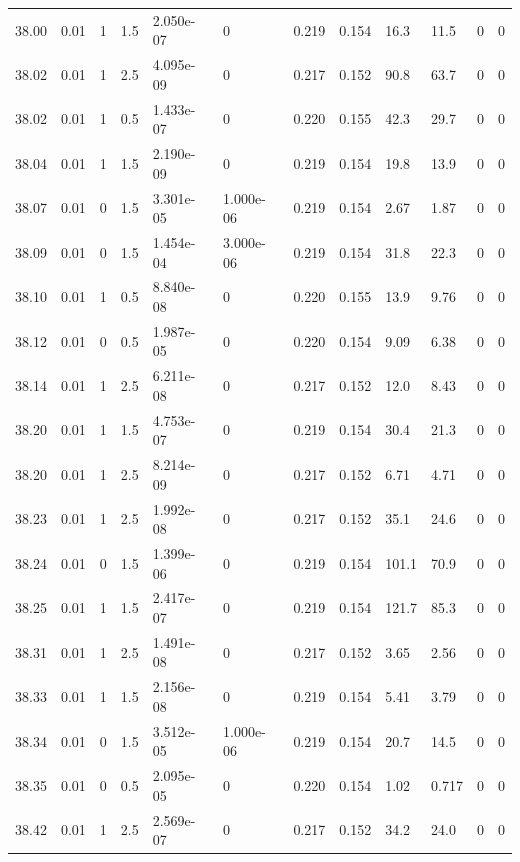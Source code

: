 \documentclass[preview]{standalone}
\begin{document}
{{{{{{{{{{{{{{{{{{\begin{tabular}{L{1.2cm}C{1.2cm} C{0.3cm}C{0.5cm} C{1.4cm}C{1.4cm} C{1.4cm}C{1.4cm} C{1.6cm}C{1.6cm} C{1.6cm}C{1.6cm}}
  38.00  &  0.01  & 1     & 1.5 &  2.050e-07  & 0  &  0.219&   0.154& 16.3 & 11.5   &  0 & 0  \\ 
  38.02  &  0.01  & 1     & 2.5 &  4.095e-09  & 0  &  0.217&   0.152& 90.8 & 63.7   &  0 & 0  \\ 
  38.02  &  0.01  & 1     & 0.5 &  1.433e-07  & 0  &  0.220&   0.155& 42.3 & 29.7   &  0 & 0  \\ 
  38.04  &  0.01  & 1     & 1.5 &  2.190e-09  & 0  &  0.219&   0.154& 19.8 & 13.9   &  0 & 0  \\ 
  38.07  &  0.01  & 0     & 1.5 &  3.301e-05  & 1.000e-06  &  0.219&   0.154& 2.67 & 1.87   &  0 & 0  \\ 
  38.09  &  0.01  & 0     & 1.5 &  1.454e-04  & 3.000e-06  &  0.219&   0.154& 31.8 & 22.3   &  0 & 0  \\ 
  38.10  &  0.01  & 1     & 0.5 &  8.840e-08  & 0  &  0.220&   0.155& 13.9 & 9.76   &  0 & 0  \\ 
  38.12  &  0.01  & 0     & 0.5 &  1.987e-05  & 0  &  0.220&   0.154& 9.09 & 6.38   &  0 & 0  \\ 
  38.14  &  0.01  & 1     & 2.5 &  6.211e-08  & 0  &  0.217&   0.152& 12.0 & 8.43   &  0 & 0  \\ 
  38.20  &  0.01  & 1     & 1.5 &  4.753e-07  & 0  &  0.219&   0.154& 30.4 & 21.3   &  0 & 0  \\ 
  38.20  &  0.01  & 1     & 2.5 &  8.214e-09  & 0  &  0.217&   0.152& 6.71 & 4.71   &  0 & 0  \\ 
  38.23  &  0.01  & 1     & 2.5 &  1.992e-08  & 0  &  0.217&   0.152& 35.1 & 24.6   &  0 & 0  \\ 
  38.24  &  0.01  & 0     & 1.5 &  1.399e-06  & 0  &  0.219&   0.154& 101.1 & 70.9   &  0 & 0  \\ 
  38.25  &  0.01  & 1     & 1.5 &  2.417e-07  & 0  &  0.219&   0.154& 121.7 & 85.3   &  0 & 0  \\ 
  38.31  &  0.01  & 1     & 2.5 &  1.491e-08  & 0  &  0.217&   0.152& 3.65 & 2.56   &  0 & 0  \\ 
  38.33  &  0.01  & 1     & 1.5 &  2.156e-08  & 0  &  0.219&   0.154& 5.41 & 3.79   &  0 & 0  \\ 
  38.34  &  0.01  & 0     & 1.5 &  3.512e-05  & 1.000e-06  &  0.219&   0.154& 20.7 & 14.5   &  0 & 0  \\ 
  38.35  &  0.01  & 0     & 0.5 &  2.095e-05  & 0  &  0.220&   0.154& 1.02 & 0.717   &  0 & 0  \\ 
  38.42  &  0.01  & 1     & 2.5 &  2.569e-07  & 0  &  0.217&   0.152& 34.2 & 24.0   &  0 & 0  \\ 

\end{tabular}}}}}}}}}}}}}}}}}}}
\end{document}
